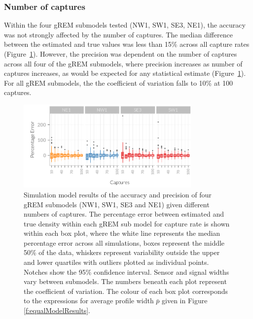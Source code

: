 \subsubsection{Number of captures}

Within the four gREM submodels tested (NW1, SW1, SE3, NE1), the accuracy was not strongly affected by the number of captures.
The median difference between the estimated and true values was less than 15\% across all capture rates (Figure~\ref{fig:Captures}).
However, the precision was dependent on the number of captures across all four of the gREM submodels, where precision increases as number of captures increases, as would be expected for any statistical estimate (Figure~\ref{fig:Captures}).
For all gREM submodels, the the coefficient of variation falls to 10\% at 100 captures. 



\begin{knitrout}\footnotesize
{}\color{fgcolor}\begin{figure}[t]

{\centering \includegraphics[width=0.8\textwidth]{figure/Captures-1} 

}

\caption[Simulation model results of the accuracy and precision of four gREM submodels]{
Simulation model results of the accuracy and precision of four gREM submodels (NW1, SW1, SE3 and NE1) given different numbers of captures.
The percentage error between estimated and true density within each gREM sub model for capture rate is shown within each box plot, where the white line represents the median percentage error across all simulations, boxes represent the middle 50\% of the data, whiskers represent variability outside the upper and lower quartiles with outliers plotted as individual points.
Notches show the 95\% confidence interval.
Sensor and signal widths vary between submodels.
The numbers beneath each plot represent the coefficient of variation.
The colour of each box plot corresponds to the expressions for average profile width $\bar{p}$ given in Figure \ref{f:equalModelResults}. 
}\label{fig:Captures}
\end{figure}


\end{knitrout}

